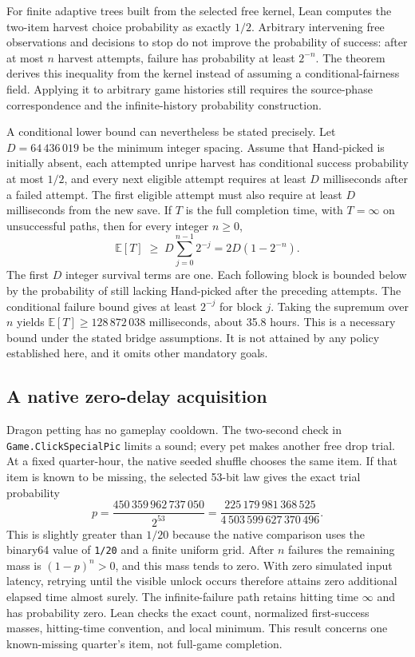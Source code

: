 \documentclass[11pt,a4paper]{article}
\numberwithin{equation}{section}
\theoremstyle{definition}
\theoremstyle{remark}
\begin{document}
For finite adaptive trees built from the selected free kernel, Lean computes the two-item harvest choice probability as exactly $1/2$. Arbitrary intervening free observations and decisions to stop do not improve the probability of success: after at most $n$ harvest attempts, failure has probability at least $2^{-n}$. The theorem derives this inequality from the kernel instead of assuming a conditional-fairness field. Applying it to arbitrary game histories still requires the source-phase correspondence and the infinite-history probability construction.

A conditional lower bound can nevertheless be stated precisely. Let $D=64\,436\,019$ be the minimum integer spacing. Assume that Hand-picked is initially absent, each attempted unripe harvest has conditional success probability at most $1/2$, and every next eligible attempt requires at least $D$ milliseconds after a failed attempt. The first eligible attempt must also require at least $D$ milliseconds from the new save. If $T$ is the full completion time, with $T=\infty$ on unsuccessful paths, then for every integer $n\geq0$,
\[
  \mathbb{E}[T]\;\geq\;
  D\sum_{j=0}^{n-1}2^{-j}
  =2D(1-2^{-n}).
\]
The first $D$ integer survival terms are one. Each following block is bounded below by the probability of still lacking Hand-picked after the preceding attempts. The conditional failure bound gives at least $2^{-j}$ for block $j$. Taking the supremum over $n$ yields $\mathbb{E}[T]\geq128\,872\,038$ milliseconds, about 35.8 hours. This is a necessary bound under the stated bridge assumptions. It is not attained by any policy established here, and it omits other mandatory goals.

\subsection{A native zero-delay acquisition}
Dragon petting has no gameplay cooldown. The two-second check in \texttt{Game.ClickSpecialPic} limits a sound; every pet makes another free drop trial. At a fixed quarter-hour, the native seeded shuffle chooses the same item. If that item is known to be missing, the selected 53-bit law gives the exact trial probability
\[
 p=\frac{450\,359\,962\,737\,050}{2^{53}}
   =\frac{225\,179\,981\,368\,525}{4\,503\,599\,627\,370\,496}.
\]
This is slightly greater than $1/20$ because the native comparison uses the binary64 value of \texttt{1/20} and a finite uniform grid. After $n$ failures the remaining mass is $(1-p)^n>0$, and this mass tends to zero. With zero simulated input latency, retrying until the visible unlock occurs therefore attains zero additional elapsed time almost surely. The infinite-failure path retains hitting time $\infty$ and has probability zero. Lean checks the exact count, normalized first-success masses, hitting-time convention, and local minimum. This result concerns one known-missing quarter's item, not full-game completion.
\end{document}
